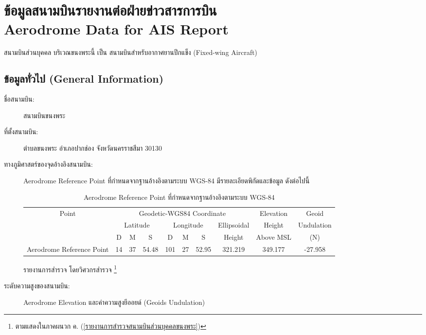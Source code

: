 
\chapter{ข้อมูลสนามบินรายงานต่อฝ่ายข่าวสารการบิน \\
Aerodrome Data for AIS Report}

สนามบินส่วนบุคคล บริเวณขนงพระนี้ เป็น สนามบินสำหรับอากาศยานปีกแข็ง (Fixed-wing Aircraft) 

\section{ข้อมูลทั่วไป (General Information)}

\begin{description}
\item[ชื่อสนามบิน:]  สนามบินขนงพระ
\item[ที่ตั้งสนามบิน:] ตำบลขนงพระ อำเภอปากช่อง จังหวัดนครราชสีมา 30130
\item[ทางภูมิศาสตร์ของจุดอ้างอิงสนามบิน:] Aerodrome Reference Point ที่กำหนดจากฐานอ้างอิงตามระบบ WGS-84 มีรายละเอียดพิกัดและข้อมูล ดังต่อไปนี้

\begin{table}[h]
\caption{Aerodrome Reference Point ที่กำหนดจากฐานอ้างอิงตามระบบ WGS-84}
\begin{center}
\begin{tabular}{|c|c|c|c|c|c|c|c|c|c|}
\hline
\multirow{3}{*}{Point} & \multicolumn{7}{c|}{Geodetic-WGS84 Coordinate} & Elevation & Geoid \\ \cline{2-10}
 & \multicolumn{3}{c|}{Latitude} & \multicolumn{3}{c|}{Longitude} & Ellipsoidal & Height & Undulation \\ \cline{2-10}
  & D & M & S & D & M & S & Height & Above MSL & (N) \\ \hline
  Aerodrome Reference Point & 14 & 37 & 54.48 & 101 & 27 & 52.95 & 321.219 & 349.177 & -27.958 \\
\hline
\end{tabular}
\end{center}
\label{default}
\end{table}%

รายงานการสำรวจ โดยวิศวกรสำรวจ \footnote{ตามแสดงในภาคผนวก ค. (\ref{รายงานการสำรวจสนามบินส่วนบุคคลขนงพระ})}

\item[ระดับความสูงของสนามบิน:]  Aerodrome Elevation และค่าความสูงยีออยด์ (Geoids Undulation)


\end{description}
